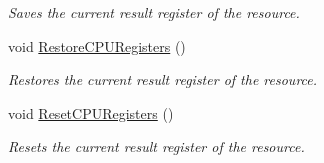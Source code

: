 \begin{DoxyCompactItemize}
\begin{DoxyCompactList}\small\item\em Saves the current result register of the resource. \end{DoxyCompactList}\item 
void \hyperlink{classpc__emulator_1_1Executor_af20b7d1a162e6b974ff228c51ea86d92}{Restore\+C\+P\+U\+Registers} ()\hypertarget{classpc__emulator_1_1Executor_af20b7d1a162e6b974ff228c51ea86d92}{}\label{classpc__emulator_1_1Executor_af20b7d1a162e6b974ff228c51ea86d92}

\begin{DoxyCompactList}\small\item\em Restores the current result register of the resource. \end{DoxyCompactList}\item 
void \hyperlink{classpc__emulator_1_1Executor_ae735d64520122eff70a5f539375027e6}{Reset\+C\+P\+U\+Registers} ()\hypertarget{classpc__emulator_1_1Executor_ae735d64520122eff70a5f539375027e6}{}\label{classpc__emulator_1_1Executor_ae735d64520122eff70a5f539375027e6}

\begin{DoxyCompactList}\small\item\em Resets the current result register of the resource. \end{DoxyCompactList}\end{DoxyCompactItemize}
